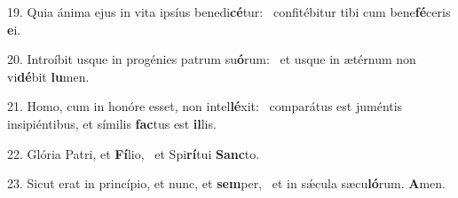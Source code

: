 19. Quia ánima ejus in vita ipsíus benedi\textbf{cé}tur: \ast\  confitébitur tibi cum bene\textbf{fé}ceris \textbf{e}i.\

20. Introíbit usque in progénies patrum su\textbf{ó}rum: \ast\  et usque in ætérnum non vi\textbf{dé}bit \textbf{lu}men.\

21. Homo, cum in honóre esset, non intel\textbf{lé}xit: \ast\  comparátus est juméntis insipiéntibus, et símilis \textbf{fac}tus est \textbf{il}lis.\

22. Glória Patri, et \textbf{Fí}lio, \ast\  et Spi\textbf{rí}tui \textbf{Sanc}to.\

23. Sicut erat in princípio, et nunc, et \textbf{sem}per, \ast\  et in sǽcula sæcu\textbf{ló}rum. \textbf{A}men.\

